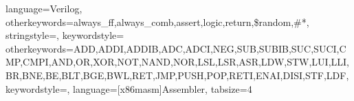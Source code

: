  {
  language=Verilog,
  otherkeywords={always\_ff,always\_comb,assert,logic,return,\$random,\#*},            %
  stringstyle=\color{mymauve},     %
  keywordstyle=\color{blue}      %
}
 {
  otherkeywords={ADD,ADDI,ADDIB,ADC,ADCI,NEG,SUB,SUBIB,SUC,SUCI,CMP,CMPI,AND,OR,XOR,NOT,NAND,NOR,LSL,LSR,ASR,LDW,STW,LUI,LLI,BR,BNE,BE,BLT,BGE,BWL,RET,JMP,PUSH,POP,RETI,ENAI,DISI,STF,LDF},            %
  keywordstyle=\color{blue},       %
  language={[x86masm]Assembler},                %
	tabsize=4
}


